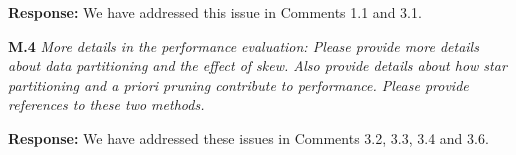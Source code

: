 \documentclass{vldb}
\begin{document}
\textbf{Response:} We have addressed this issue in Comments 1.1 and 3.1.

\textbf{M.4} \emph{More details in the performance evaluation: Please provide more details about data partitioning and the effect of skew. Also provide details about how star partitioning and a priori pruning contribute to performance. Please provide references to these two methods.}

\textbf{Response:} We have addressed these issues in Comments 3.2, 3.3, 3.4 and 3.6.



\end{document}
